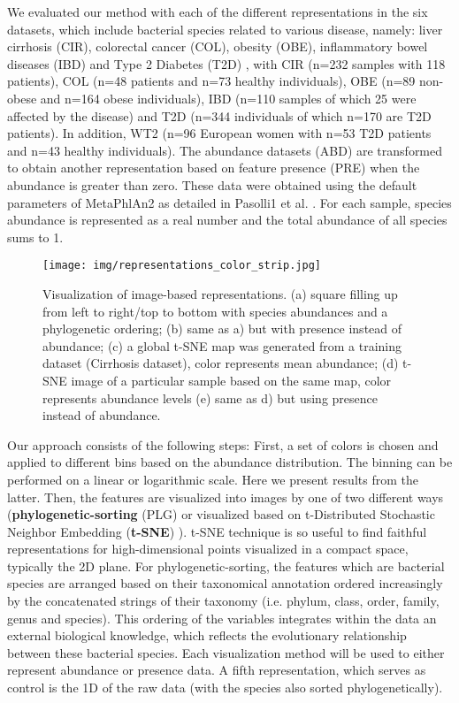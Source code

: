 \documentclass{article}
\begin{document}
We evaluated our method with each of the different representations in the six datasets, which include bacterial species related to various disease, namely: liver cirrhosis (CIR), colorectal cancer (COL), obesity (OBE), inflammatory bowel diseases (IBD) and Type 2 Diabetes (T2D) \cite{ML_large_metagenomic_tool_insight2016,cirrhosis_2014,colorectal_2014,obesity_2013,ibd_2010,t2d_2012,wt2d_2013}, with CIR (n=232 samples with 118 patients), COL (n=48 patients and n=73 healthy individuals), OBE (n=89 non-obese and n=164 obese individuals), IBD (n=110 samples of which 25 were affected by the disease) and T2D (n=344 individuals of which n=170 are T2D patients). In addition, WT2 (n=96 European women with n=53 T2D patients and n=43 healthy individuals). The abundance datasets (ABD) are transformed to obtain another representation based on feature presence (PRE) when the abundance is greater than zero. These data were obtained using the default parameters of MetaPhlAn2 \cite{metaphan2} as detailed in Pasolli1 et al. \cite{ML_large_metagenomic_tool_insight2016}. For each sample, species abundance is represented as a real number and the total abundance of all species sums to 1.
\begin{figure}[ht]
\centering
\texttt{[image: img/representations\_color\_strip.jpg]}
\caption{Visualization of image-based representations. (a) square filling up from left to right/top to bottom with species abundances and a phylogenetic ordering; (b) same as a) but with presence instead of abundance; (c) a global t-SNE map was generated from a training dataset (Cirrhosis dataset), color represents mean abundance; (d) t-SNE image of a particular sample based on the same map, color represents abundance levels (e) same as d) but using presence instead of abundance.}
\label{fig:representations_color_strip}
\end{figure}
Our approach consists of the following steps: First, a set of colors is chosen and applied to different bins based on the abundance distribution. The binning can be performed on a linear or logarithmic scale. Here we present results from the latter. Then, the features are visualized into images by one of two different ways (\textbf{phylogenetic-sorting} (PLG) or visualized based on t-Distributed Stochastic Neighbor Embedding (\textbf{t-SNE}) \cite{tsne_2008}). t-SNE technique is so useful to find faithful representations for high-dimensional points visualized in a compact space, typically the 2D plane. For phylogenetic-sorting, the features which are bacterial species are arranged based on their taxonomical annotation ordered increasingly by the concatenated strings of their taxonomy (i.e. phylum, class, order, family, genus and species). This ordering of the variables integrates within the data an external biological knowledge, which reflects the evolutionary relationship between these bacterial species. Each visualization method will be used to either represent abundance or presence data. A fifth representation, which serves as control is the 1D of the raw data (with the species also sorted phylogenetically).
\end{document}
